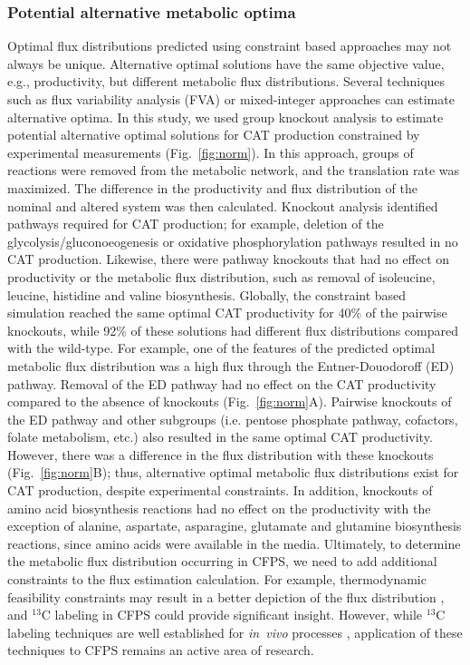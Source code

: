 \documentclass[journal=asbcd6,manuscript=article]{achemso}
\begin{document}
\subsubsection{Potential alternative metabolic optima}
Optimal flux distributions predicted using constraint based approaches may not always be unique.
Alternative optimal solutions have the same objective value, e.g., productivity, but different metabolic flux distributions.
Several techniques such as flux variability analysis (FVA) \cite{Mahadevan2003264,Schuetz119} or mixed-integer approaches \cite{LEE2000711} can estimate alternative optima.
In this study, we used group knockout analysis to estimate potential alternative optimal solutions for CAT production constrained by experimental measurements (Fig.~\ref{fig:norm}).
In this approach, groups of reactions were removed from the metabolic network, and the translation rate was maximized.
The difference in the productivity and flux distribution of the nominal and altered system was then calculated.
Knockout analysis identified pathways required for CAT production; for example, deletion of the glycolysis/gluconoeogenesis or oxidative phosphorylation pathways resulted in no CAT production.
Likewise, there were pathway knockouts that had no effect on productivity or the metabolic flux distribution, such as removal of isoleucine, leucine, histidine and valine biosynthesis.
Globally, the constraint based simulation reached the same optimal CAT productivity for 40\% of the pairwise knockouts, while 92\% of these solutions had different flux distributions compared with the wild-type.
For example, one of the features of the predicted optimal metabolic flux distribution was a high flux through the Entner-Douodoroff (ED) pathway.
Removal of the ED pathway had no effect on the CAT productivity compared to the absence of knockouts (Fig.~\ref{fig:norm}A).
Pairwise knockouts of the ED pathway and other subgroups (i.e. pentose phosphate pathway, cofactors, folate metabolism, etc.) also resulted in the same optimal CAT productivity.
However, there was a difference in the flux distribution with these knockouts (Fig.~\ref{fig:norm}B); thus, alternative optimal metabolic flux distributions exist for CAT production, despite experimental constraints.
In addition, knockouts of amino acid biosynthesis reactions had no effect on the productivity with the exception of alanine, aspartate, asparagine, glutamate and glutamine biosynthesis reactions, since amino acids were available in the media.
Ultimately, to determine the metabolic flux distribution occurring in CFPS, we need to add additional constraints to the flux estimation calculation.
For example, thermodynamic feasibility constraints may result in a better depiction of the flux distribution \cite{Henry:2007,Hamilton:2013}, and $^{13}$C labeling in CFPS could provide significant insight.
However, while $^{13}$C labeling techniques are well established for \emph{in~vivo} processes \cite{Zamboni:2009}, application of these techniques to CFPS remains an active area of research.
\end{document}
